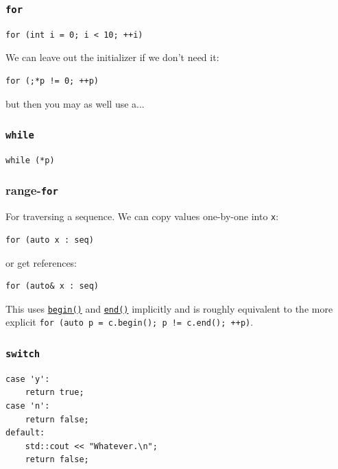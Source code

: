 \documentclass[table, xcdraw]{article}%
\begin{document}
\subsubsection{\texttt{for}}

\begin{verbatim}
for (int i = 0; i < 10; ++i)
\end{verbatim}

We can leave out the initializer if we don't need it:

\begin{verbatim}
for (;*p != 0; ++p)
\end{verbatim}

but then you may as well use a...

\subsubsection{\texttt{while}}

\begin{verbatim}
while (*p)
\end{verbatim}

\subsubsection{range-\texttt{for}}
For traversing a sequence. We can copy values one-by-one into \texttt{x}:

\begin{verbatim}
for (auto x : seq)
\end{verbatim}

or get references:

\begin{verbatim}
for (auto& x : seq)
\end{verbatim}

This uses \hyperref[begin]{\texttt{begin()}} and \hyperref[begin]{\texttt{end()}} implicitly and is roughly equivalent to the more explicit \texttt{for (auto p = c.begin(); p != c.end(); ++p)}.

\subsubsection{\texttt{switch}} \label{switch}

\begin{verbatim}
case 'y':
    return true;
case 'n':
    return false;
default:
    std::cout << "Whatever.\n";
    return false;
\end{verbatim}
\end{document}
